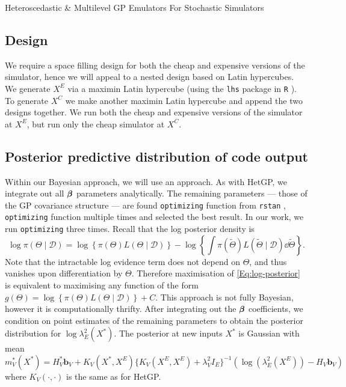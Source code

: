 \begin{chapter}{Heteroscedastic \& Multilevel GP Emulators For Stochastic Simulators\label{Ch:Hetsml}}
\subsection{Design \label{Sec:design}}
We require a space filling design for both the cheap and expensive versions of the simulator, hence we will appeal to a nested design based on Latin hypercubes. We generate $X^E$ via a maximin Latin hypercube \citep{Morris1995} (using the \verb|lhs| package in \verb|R| \citep{LHSpkg}). To generate $X^C$ we make another maximin Latin hypercube and append the two designs together. We run both the cheap and expensive versions of the simulator at $X^E$, but run only the cheap simulator at $X^C$.
\subsection{Posterior predictive distribution of code output \label{sec:ppd}}
Within our Bayesian approach, we will use an  approach. As with HetGP, we integrate out all $\bm{\beta}$ parameters analytically. The remaining parameters --- those of the GP covariance structure --- are found  \verb|optimizing| function from \verb|rstan| \citep{stan},  \verb|optimizing| function multiple times and selected the best result. In our work, we run \verb|optimizing| three times. Recall that the log posterior density is
\begin{equation}
	\log \pi(\Theta \mid \mathcal{D}) = \log \left\{ \pi(\Theta)L(\Theta \mid \mathcal{D}) \right\} - \log \left\{ \int  \pi(\tilde{\Theta})L(\tilde{\Theta} \mid \mathcal{D}) \dd \tilde{\Theta} \right\}. \label{Eq:log-posterior}
\end{equation}
Note that the intractable log evidence term does not depend on $\Theta$, and thus vanishes upon differentiation by $\Theta$. Therefore maximisation of \cref{Eq:log-posterior} is equivalent to maximising any function of the form $g(\Theta) = \log \left\{ \pi(\Theta)L(\Theta \mid \mathcal{D}) \right\} + C$. This  approach is not fully Bayesian, however it is computationally thrifty.
After integrating out the $\bm{\beta}$ coefficients, we condition on point estimates of the remaining parameters to obtain the posterior distribution for $\log \lambda^2_E (X^{*})$. The posterior at new inputs $X^{*}$ is Gaussian with mean
\begin{equation*}
m^*_V (X^{*}) = H^{*}_V \bm{b}_V + K_V(X^{*}, X^E) \big\{ K_V(X^E, X^E) + \lambda_{V}^2 I_E \big\} ^{-1} (\log (\lambda^2_E(X^E)) - H_V \bm{b}_V )
\end{equation*}
where $K_V(\cdot, \cdot)$ is the same as for HetGP.


\end{chapter}
